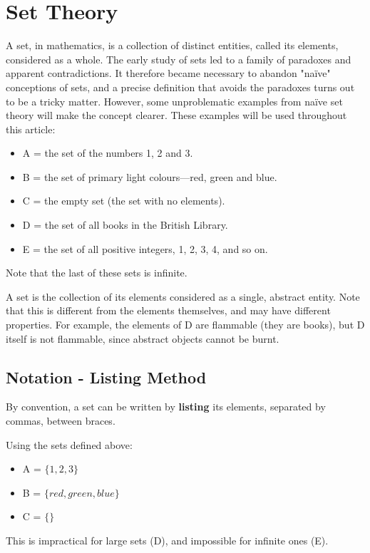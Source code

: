 \documentclass[12pt]{article}
\title{}
\author{}
\begin{document}
\section{Set Theory}
A set, in mathematics, is a collection of distinct entities, called its elements, considered as a whole. The early study of sets led to a family of paradoxes and apparent contradictions. It therefore became necessary to abandon "naïve" conceptions of sets, and a precise definition that avoids the paradoxes turns out to be a tricky matter. However, some unproblematic examples from naïve set theory will make the concept clearer. These examples will be used throughout this article:

\begin{itemize}
\item A = the set of the numbers 1, 2 and 3.
\item B = the set of primary light colours—red, green and blue.
\item C = the empty set (the set with no elements).
\item D = the set of all books in the British Library.
\item E = the set of all positive integers, 1, 2, 3, 4, and so on.
\end{itemize}

Note that the last of these sets is infinite.

A set is the collection of its elements considered as a single, abstract entity. Note that this is different from the elements themselves, and may have different properties. For example, the elements of D are flammable (they are books), but D itself is not flammable, since abstract objects cannot be burnt.

\subsection{Notation - Listing Method}

By convention, a set can be written by \textbf{listing} its elements, separated by commas, between {braces}. 

Using the sets defined above:
\begin{itemize}
\item A = $\{1, 2, 3\}$
\item B = $\{red, green, blue\}$
\item C = $\{\}$
\end{itemize}
This is impractical for large sets (D), and impossible for infinite ones (E). 
\end{document}
